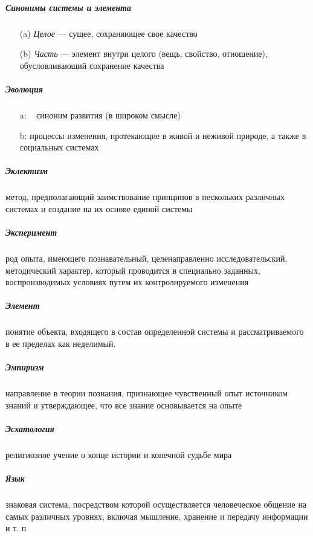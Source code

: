 \documentclass[a4paper, 12pt]{article}
\theoremstyle{plain} %
\theoremstyle{definition} %
\theoremstyle{remark} %
\begin{document}
\subparagraph{Синонимы системы и элемента}
\begin{itemize}
	\item[(a)] \emph{Целое} --- сущее, сохраняющее свое качество
	\item[(b)] \emph{Часть} ---  элемент внутри целого (вещь, свойство, отношение), обусловливающий сохранение качества
\end{itemize}

\subparagraph{Эволюция}
\begin{itemize}
	\item[a:] ~ синоним развития (в широком смысле)
	\item[b:] процессы изменения, протекающие в живой и неживой природе, а также в социальных системах
\end{itemize}

\subparagraph{Эклектизм}
	 метод, предполагающий заимствование принципов в нескольких различных системах и создание на их основе единой системы

\subparagraph{Эксперимент}
	род опыта, имеющего познавательный, целенаправленно исследовательский, методический характер, который проводится в специально заданных, воспроизводимых условиях путем их контролируемого изменения

\subparagraph{Элемент}
	понятие объекта, входящего в состав определенной системы и рассматриваемого в ее пределах как неделимый.

\subparagraph{Эмпиризм}
	 направление в теории познания, признающее чувственный опыт источником знаний и утверждающее, что все знание основывается на опыте

\subparagraph{Эсхатология}
	религиозное учение о конце истории и конечной судьбе мира

\subparagraph{Язык}
знаковая система, посредством которой осуществляется человеческое общение на самых различных уровнях, включая мышление, хранение и передачу информации и т. п
\end{document}
